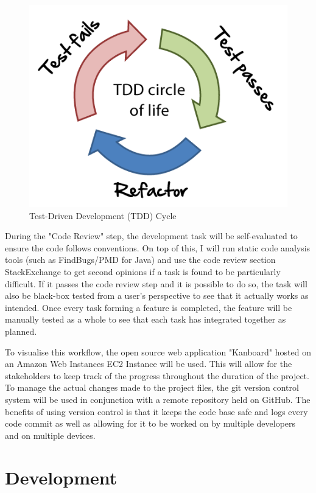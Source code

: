 \documentclass[]{report}
\begin{document}
	\begin{figure}[H]
		\caption{
			Test-Driven Development (TDD) Cycle
			\cite{TDD Diagram}
		}
		\centering
		\includegraphics[scale=0.5]{tdd-circle-of-life.png}
	\end{figure}
	
	During the "Code Review" step, the development task will be self-evaluated to ensure the code follows conventions. On top of this, I will run static code analysis tools (such as FindBugs/PMD for Java) and use the code review section StackExchange to get second opinions if a task is found to be particularly difficult. If it passes the code review step and it is possible to do so, the task will also be black-box tested from a user's perspective to see that it actually works as intended. Once every task forming a feature is completed, the feature will be manually tested as a whole to see that each task has integrated together as planned.
	
	To visualise this workflow, the open source web application "Kanboard" hosted on an Amazon Web Instances EC2 Instance will be used. This will allow for the stakeholders to keep track of the progress throughout the duration of the project. To manage the actual changes made to the project files, the git version control system will be used in conjunction with a remote repository held on GitHub. The benefits of using version control is that it keeps the code base safe and logs every code commit as well as allowing for it to be worked on by multiple developers and on multiple devices. 
	
	\chapter{Development}
\end{document}
